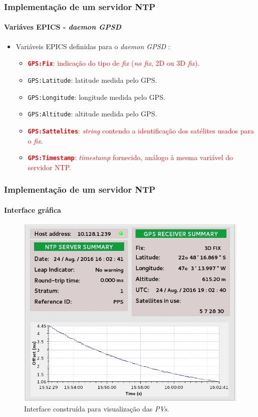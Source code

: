 \documentclass{beamer}
\begin{document}
\begin{frame}
\frametitle{Implementação de um servidor NTP}
\framesubtitle{Variáves EPICS - \textit{daemon GPSD}}

\begin{itemize}
  \item Variáveis EPICS definidas para o \textit{daemon GPSD} :
  \vspace{12pt}
	\begin{itemize}
	\item \textcolor{red}{\textbf{\texttt{GPS:Fix}}: indicação do tipo de
	\textit{fix} (\textit{no fix}, 2D ou 3D \textit{fix}).}
	\item \texttt{GPS:Latitude}: latitude medida pelo GPS.
	\item \texttt{GPS:Longitude}: longitude medida pelo GPS.
	\item \texttt{GPS:Altitude}: altitude medida pelo GPS.
	\item \textcolor{red}{\textbf{\texttt{GPS:Sattelites}}: \textit{string}
	contendo a identificação dos satélites usados para o \textit{fix}.}
	\item \textcolor{red}{\textbf{\texttt{GPS:Timestamp}}: \textit{timestamp}
	fornecido, análogo à mesma variável do servidor NTP.}
	\end{itemize}	    
\end{itemize}
\end{frame}

\begin{frame}
\frametitle{Implementação de um servidor NTP}
\framesubtitle{Interface gráfica} 
\begin{figure}[h]
    \centering
    \includegraphics[scale=0.26]{image/epics-opi-ntpgps}
    \caption {Interface construída para visualização das
    \textit{PVs}.}
    \label{img:ntp-opi} 
\end{figure} 

\end{frame}
\end{document}

